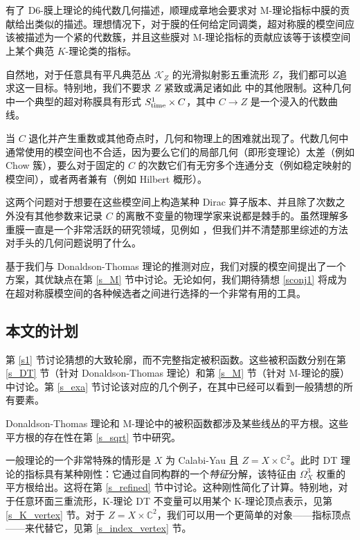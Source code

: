 \documentclass[12pt]{article}
\newcommand{\C}{\mathbb{C}}
\newcommand{\cK}{\mathscr{K}}
\theoremstyle{definition}
\begin{document}
\subsubsection{\ }

有了 D6-膜上理论的纯代数几何描述，顺理成章地会要求对 M-理论指标中膜的贡献给出类似的描述。理想情况下，对于膜的任何给定同调类，超对称膜的模空间应该被描述为一个紧的代数簇，并且这些膜对 M-理论指标的贡献应该等于该模空间上某个典范 $K$-理论类的指标。

自然地，对于任意具有平凡典范丛 $\cK_Z$ 的光滑拟射影五重流形 $Z$，我们都可以追求这一目标。特别地，我们不要求 $Z$ 紧致或满足诸如此 \cite{HLS} 中的其他限制。这种几何中一个典型的超对称膜具有形式 $S^1_{\textup{time}} \times C$，其中 $C\to Z$ 是一个浸入的代数曲线。

当 $C$ 退化并产生重数或其他奇点时，几何和物理上的困难就出现了。代数几何中通常使用的模空间也不合适，因为要么它们的局部几何（即形变理论）太差（例如 Chow 簇），要么对于固定的 $C$ 的次数它们有无穷多个连通分支（例如稳定映射的模空间），或者两者兼有（例如 Hilbert 概形）。

这两个问题对于想要在这些模空间上构造某种 Dirac 算子版本、并且除了次数之外没有其他参数来记录 $C$ 的离散不变量的物理学家来说都是棘手的。虽然理解多重膜一直是一个非常活跃的研究领域，见例如 \cite{BLMP}，但我们并不清楚那里综述的方法对手头的几何问题说明了什么。

基于我们与 Donaldson-Thomas 理论的推测对应，我们对膜的模空间提出了一个方案，其优缺点在第 \ref{s_M} 节中讨论。无论如何，我们期待猜想 \ref{sconj1} 将成为在超对称膜模空间的各种候选者之间进行选择的一个非常有用的工具。

\subsection{本文的计划}

第 \ref{s1} 节讨论猜想的大致轮廓，而不完整指定被积函数。这些被积函数分别在第 \ref{s_DT} 节（针对 Donaldson-Thomas 理论）和第 \ref{s_M} 节（针对 M-理论的膜）中讨论。第 \ref{s_exa} 节讨论该对应的几个例子，在其中已经可以看到一般猜想的所有要素。

Donaldson-Thomas 理论和 M-理论中的被积函数都涉及某些线丛的平方根。这些平方根的存在性在第 \ref{s_sqrt} 节中研究。

一般理论的一个非常特殊的情形是 $X$ 为 Calabi-Yau 且 $Z=X \times \C^2$。此时 DT 理论的指标具有某种刚性：它通过自同构群的一个\emph{特征}分解，该特征由 $\Omega^3_X$ 权重的平方根给出。这将在第 \ref{s_refined} 节中讨论。这种刚性简化了计算。特别地，对于任意环面三重流形，K-理论 DT 不变量可以用某个 K-理论顶点表示，见第 \ref{s_K_vertex} 节。对于 $Z=X \times \C^2$，我们可以用一个更简单的对象——指标顶点——来代替它，见第 \ref{s_index_vertex} 节。
\end{document}
